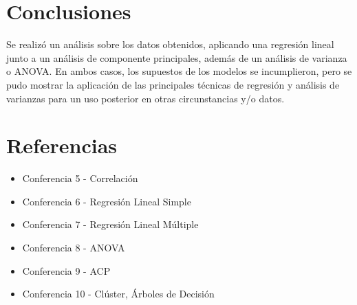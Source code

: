 \documentclass[a4paper,10pt,twocolumn]{article}
\begin{document}
\section{Conclusiones}\label{sec:conc}

Se realizó un análisis sobre los datos obtenidos, aplicando una regresión lineal junto a un análisis de componente principales, además de un análisis de varianza o ANOVA. En ambos casos, los supuestos de los modelos se incumplieron, pero se pudo mostrar la aplicación de las principales técnicas de regresión y análisis de varianzas para un uso posterior en otras circunstancias y/o datos.

\section{Referencias}\label{sec:ref}

\begin{itemize}
	\item Conferencia 5 - Correlación
	\item Conferencia 6 - Regresión Lineal Simple
	\item Conferencia 7 - Regresión Lineal Múltiple
	\item Conferencia 8 - ANOVA
	\item Conferencia 9 - ACP
	\item Conferencia 10 - Clúster, Árboles de Decisión
\end{itemize}

\label{end}
\end{document}

